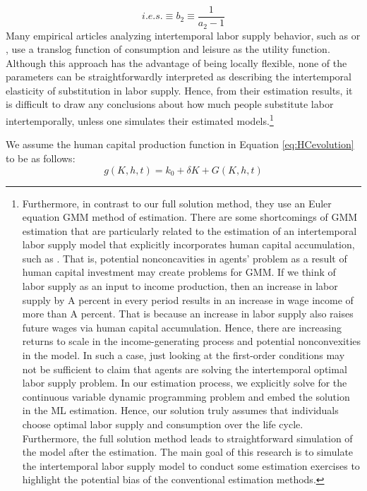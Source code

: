 \documentclass{article}
\begin{document}
\begin{equation*}
  i.e.s. \equiv b_2 \equiv \dfrac{1}{a_2-1}
\end{equation*}
Many empirical articles analyzing intertemporal labor supply behavior, such as \cite{Shaw1989-jb} or \cite{Hotz1988-gl}, use a translog function of consumption and leisure as the utility function. Although this approach has the advantage of being locally flexible, none of the parameters can be straightforwardly interpreted as describing the intertemporal elasticity of substitution in labor supply. Hence, from their estimation results, it is difficult to draw any conclusions about how much people substitute labor intertemporally, unless one simulates their estimated models.\footnote[6]{ Furthermore, in contrast to our full solution method, they use an Euler equation GMM method of estimation. There are some shortcomings of GMM estimation that are particularly related to the estimation of an intertemporal labor supply model that explicitly incorporates human capital accumulation, such as \cite{Shaw1989-jb}. That is, potential nonconcavities in agents' problem as a result of human capital investment may create problems for GMM. If we think of labor supply as an input to income production, then an increase in labor supply by A percent in every period results in an increase in wage income of more than A percent. That is because an increase in labor supply also raises future wages via human capital accumulation. Hence, there are increasing returns to scale in the income-generating process and potential nonconvexities in the model. In such a case, just looking at the first-order conditions may not be sufficient to claim that agents are solving the intertemporal optimal labor supply problem. In our estimation process, we explicitly solve for the continuous variable dynamic programming problem and embed the solution in the ML estimation. Hence, our solution truly assumes that individuals choose optimal labor supply and consumption over the life cycle. Furthermore, the full solution method leads to straightforward simulation of the model after the estimation. The main goal of this research is to simulate the intertemporal labor supply model to conduct some estimation exercises to highlight the potential bias of the conventional estimation methods.} \par
We assume the human capital production function in Equation \eqref{eq:HCevolution} to be as follows:
\begin{equation} \tag{4a}
g(K,h,t) = k_0 + \delta K + G(K,h,t)
  \end{equation}
\end{document}
